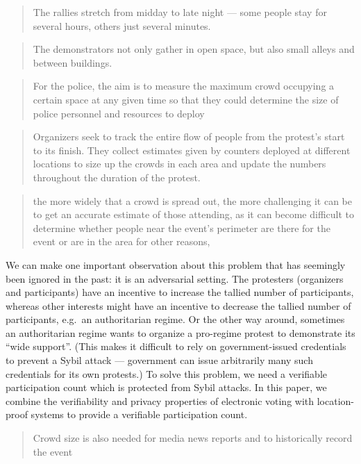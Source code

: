 \blockcquote{2016DemonstrationsInSeoul}{%
  The rallies stretch from midday to late night --- some people stay for 
  several hours, others just several minutes.%
}

\blockcquote{2016DemonstrationsInSeoul}{%
  The demonstrators not only gather in open space, but also small alleys and 
  between buildings.%
}

\blockcquote{2016DemonstrationsInSeoul}{%
  For the police, the aim is to measure the maximum crowd occupying a certain 
  space at any given time so that they could determine the size of police 
  personnel and resources to deploy%
}

\blockcquote{2016DemonstrationsInSeoul}{%
  Organizers seek to track the entire flow of people from the protest’s start 
  to its finish. They collect estimates given by counters deployed at different 
  locations to size up the crowds in each area and update the numbers 
  throughout the duration of the protest.%
}

\blockcquote{HowToEstimateCrowdSize}{%
  the more widely that a crowd is spread out, the more challenging it can be to 
  get an accurate estimate of those attending, as it can become difficult to 
  determine whether people near the event's perimeter are there for the event 
  or are in the area for other reasons,%
}


We can make one important observation about this problem that has seemingly 
been ignored in the past: it is an adversarial setting.
The protesters (organizers and participants) have an incentive to increase the 
tallied number of participants, whereas other interests might have an incentive 
to decrease the tallied number of participants, e.g.\ an authoritarian regime.
Or the other way around, sometimes an authoritarian regime wants to organize a 
pro-regime protest to demonstrate its \enquote{wide support}.
(This makes it difficult to rely on government-issued credentials to prevent a 
Sybil attack --- government can issue arbitrarily many such credentials for its 
own protests.)
To solve this problem, we need a verifiable participation count which is 
protected from Sybil attacks.
In this paper, we combine the verifiability and privacy properties of 
electronic voting with location-proof systems to provide a verifiable 
participation count.


\blockcquote{HowToEstimateCrowdSize}{%
  Crowd size is also needed for media news reports and to historically record 
  the event%
}


